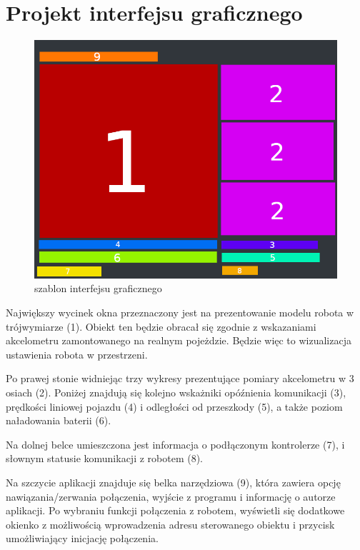 \documentclass[12pt,a4paper,polish]{article}
\begin{document}
  \newpage

  \section{Projekt interfejsu graficznego}
  \begin{figure}[ht]
    \centering
    \includegraphics[width=1\textwidth]{img/schemat2.png}
    \caption{szablon interfejsu graficznego}
    \label{fig:interfejs}
  \end{figure}

  Największy wycinek okna przeznaczony jest na prezentowanie modelu
  robota w trójwymiarze (1). Obiekt ten będzie obracał się zgodnie z
  wskazaniami akcelometru zamontowanego na realnym pojeżdzie. Będzie
  więc to wizualizacja ustawienia robota w przestrzeni.

  Po prawej stonie widniejąc trzy wykresy prezentujące pomiary
  akcelometru w 3 osiach (2). Poniżej znajdują się kolejno wskażniki 
  opóźnienia  komunikacji (3), prędkości liniowej pojazdu (4) i odległości od
  przeszkody (5), a także poziom naładowania baterii (6).

  Na dolnej belce umieszczona jest informacja o podłączonym kontrolerze (7),
  i słownym statusie komunikacji z robotem (8).
  
  Na szczycie aplikacji znajduje się belka narzędziowa (9), która zawiera 
  opcję nawiązania/zerwania połączenia, wyjście z programu i informację
  o autorze aplikacji. Po wybraniu funkcji połączenia z robotem, 
  wyświetli się dodatkowe okienko z możliwością wprowadzenia adresu 
  sterowanego obiektu i przycisk umożliwiający inicjację połączenia.
  
\end{document}
